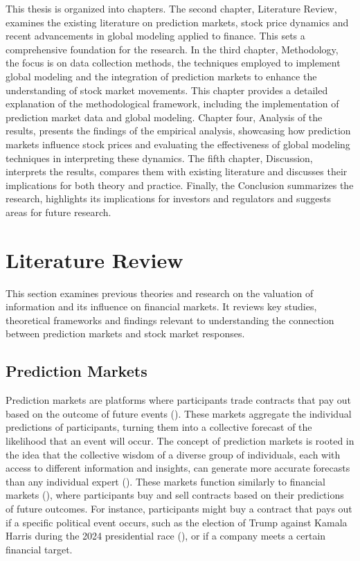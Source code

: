 \documentclass[12pt]{report}
\begin{document}
This thesis is organized into chapters. The second chapter, Literature Review, examines the existing literature on prediction markets, stock price dynamics and recent advancements in global modeling applied to finance. This sets a comprehensive foundation for the research. In the third chapter, Methodology, the focus is on data collection methods, the techniques employed to implement global modeling and the integration of prediction markets to enhance the understanding of stock market movements. This chapter provides a detailed explanation of the methodological framework, including the implementation of prediction market data and  global modeling. Chapter four, Analysis of the results, presents the findings of the empirical analysis, showcasing how prediction markets influence stock prices and evaluating the effectiveness of global modeling techniques in interpreting these dynamics. The fifth chapter, Discussion, interprets the results, compares them with existing literature and discusses their implications for both theory and practice. Finally, the Conclusion summarizes the research, highlights its implications for investors and regulators and suggests areas for future research.
\\


\newpage
\section{Literature Review}
This section examines previous theories and research on the valuation of information and its influence on financial markets. It reviews key studies, theoretical frameworks and findings relevant to understanding the connection between prediction markets and stock market responses.



\subsection{Prediction Markets}

Prediction markets are platforms where participants trade contracts that pay out based on the outcome of future events (\cite{wolfers_prediction_2004}). These markets aggregate the individual predictions of participants, turning them into a collective forecast of the likelihood that an event will occur. The concept of prediction markets is rooted in the idea that the collective wisdom of a diverse group of individuals, each with access to different information and insights, can generate more accurate forecasts than any individual expert (\cite{bossaerts_price_2022}). These markets function similarly to financial markets (\cite{wolfers_prediction_2004}), where participants buy and sell contracts based on their predictions of future outcomes. For instance, participants might buy a contract that pays out if a specific political event occurs, such as the election of Trump against Kamala Harris during the 2024 presidential race (\cite{mongrain_introduction_2024}), or if a company meets a certain financial target.\\
\end{document}

